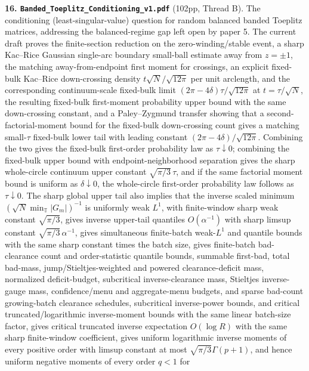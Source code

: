 \documentclass[11pt]{article}
\begin{document}
\textbf{16. \texttt{Banded\_Toeplitz\_Conditioning\_v1.pdf}} (102pp, Thread B).
The conditioning (least-singular-value) question for random balanced banded
Toeplitz matrices, addressing the balanced-regime gap left open by paper 5.  The
current draft proves the finite-section reduction on the zero-winding/stable
event, a sharp Kac--Rice Gaussian single-arc boundary small-ball estimate away
from \(z=\pm1\), the matching away-from-endpoint first moment for crossings, an
explicit fixed-bulk Kac--Rice down-crossing density
\(t\sqrt N/\sqrt{12\pi}\) per unit arclength, and the corresponding
continuum-scale fixed-bulk limit
\((2\pi-4\delta)\tau/\sqrt{12\pi}\) at \(t=\tau/\sqrt N\),
the resulting fixed-bulk first-moment probability upper bound with the same
down-crossing constant, and a Paley--Zygmund transfer showing that a
second-factorial-moment bound for the fixed-bulk down-crossing count gives a
matching small-\(\tau\) fixed-bulk lower tail with leading constant
\((2\pi-4\delta)/\sqrt{12\pi}\). Combining the two gives the fixed-bulk
first-order probability law as \(\tau\downarrow0\); combining the fixed-bulk
upper bound with endpoint-neighborhood separation gives the sharp whole-circle
continuum upper constant \(\sqrt{\pi/3}\,\tau\), and if the same factorial
moment bound is uniform as \(\delta\downarrow0\), the whole-circle first-order
probability law follows as \(\tau\downarrow0\). The sharp global upper tail also
implies that the inverse scaled minimum
\((\sqrt N\min_{\mathbb T}|G_m|)^{-1}\) is uniformly weak \(L^1\), with
finite-window sharp weak constant \(\sqrt{\pi/3}\), gives inverse upper-tail
quantiles \(O(\alpha^{-1})\) with sharp limsup constant
\(\sqrt{\pi/3}\,\alpha^{-1}\), gives simultaneous finite-batch weak-\(L^1\)
and quantile bounds with the same sharp constant times the batch size, gives
finite-batch bad-clearance count and order-statistic quantile bounds, summable
first-bad, total bad-mass, jump/Stieltjes-weighted and powered clearance-deficit mass,
normalized deficit-budget, subcritical inverse-clearance mass, Stieltjes inverse-gauge mass,
confidence/menu and aggregate-menu budgets, and sparse bad-count growing-batch clearance schedules,
subcritical inverse-power bounds, and critical
truncated/logarithmic inverse-moment bounds with the same linear batch-size
factor, gives critical
truncated inverse expectation \(O(\log R)\) with the
same sharp finite-window coefficient, gives uniform
logarithmic inverse moments of every positive order with limsup constant at
most \(\sqrt{\pi/3}\Gamma(p+1)\), and hence uniform negative
moments of every order \(q<1\) for
\end{document}
